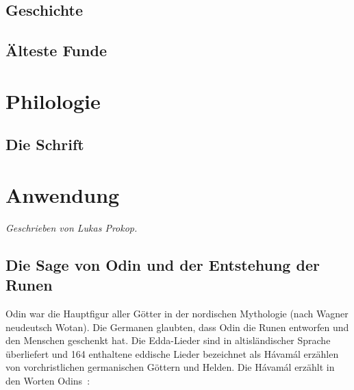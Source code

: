 \documentclass[a4paper]{scrartcl}
\begin{document}
\subsection{Geschichte}
\subsection{Älteste Funde}
\section{Philologie}
\subsection{Die Schrift}

\newpage

\section{Anwendung}
\emph{Geschrieben von Lukas Prokop.}

\subsection{Die Sage von Odin und der Entstehung der Runen}
%
Odin war die Hauptfigur aller Götter in der nordischen Mythologie (nach Wagner neudeutsch \glqq Wotan\grqq). Die Germanen glaubten, dass Odin die Runen entworfen und den Menschen geschenkt hat. Die Edda-Lieder sind in altisländischer Sprache überliefert und 164 enthaltene eddische Lieder bezeichnet als Hávamál erzählen von vorchristlichen germanischen Göttern und Helden. Die Hávamál erzählt in den Worten Odins~\cite{havamal}:
\end{document}
